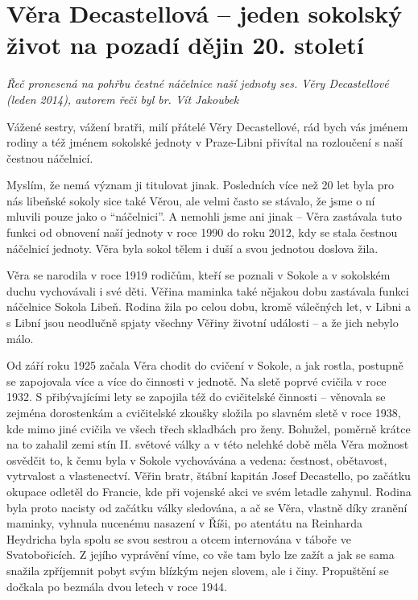 \section{Věra Decastellová -- jeden sokolský život na pozadí dějin 20.
století}\label{vux11bra-decastellovuxe1-jeden-sokolskuxfd-ux17eivot-na-pozaduxed-dux11bjin-20.-stoletuxed}

\emph{Řeč pronesená na pohřbu čestné náčelnice naší jednoty ses. Věry
Decastellové (leden 2014), autorem řeči byl br. Vít Jakoubek}

Vážené sestry, vážení bratři, milí přátelé Věry Decastellové, rád bych
vás jménem rodiny a též jménem sokolské jednoty v Praze-Libni přivítal
na rozloučení s naší čestnou náčelnicí.

Myslím, že nemá význam ji titulovat jinak. Posledních více než 20 let
byla pro nás libeňské sokoly sice také Věrou, ale velmi často se
stávalo, že jsme o ní mluvili pouze jako o ``náčelnici''. A nemohli jsme
ani jinak -- Věra zastávala tuto funkci od obnovení naší jednoty v roce
1990 do roku 2012, kdy se stala čestnou náčelnicí jednoty. Věra byla
sokol tělem i duší a svou jednotou doslova žila.

Věra se narodila v roce 1919 rodičům, kteří se poznali v Sokole a v
sokolském duchu vychovávali i své děti. Věřina maminka také nějakou dobu
zastávala funkci náčelnice Sokola Libeň. Rodina žila po celou dobu,
kromě válečných let, v Libni a s Libní jsou neodlučně spjaty všechny
Věřiny životní události -- a že jich nebylo málo.

Od září roku 1925 začala Věra chodit do cvičení v Sokole, a jak rostla,
postupně se zapojovala více a více do činnosti v jednotě. Na sletě
poprvé cvičila v roce 1932. S přibývajícími lety se zapojila též do
cvičitelské činnosti -- věnovala se zejména dorostenkám a cvičitelské
zkoušky složila po slavném sletě v roce 1938, kde mimo jiné cvičila ve
všech třech skladbách pro ženy. Bohužel, poměrně krátce na to zahalil
zemi stín II. světové války a v této nelehké době měla Věra možnost
osvědčit to, k čemu byla v Sokole vychovávána a vedena: čestnost,
obětavost, vytrvalost a vlastenectví. Věřin bratr, štábní kapitán Josef
Decastello, po začátku okupace odletěl do Francie, kde při vojenské akci
ve svém letadle zahynul. Rodina byla proto nacisty od začátku války
sledována, a ač se Věra, vlastně díky zranění maminky, vyhnula nucenému
nasazení v Říši, po atentátu na Reinharda Heydricha byla spolu se svou
sestrou a otcem internována v táboře ve Svatobořicích. Z jejího
vyprávění víme, co vše tam bylo lze zažít a jak se sama snažila
zpříjemnit pobyt svým blízkým nejen slovem, ale i činy. Propuštění se
dočkala po bezmála dvou letech v roce 1944.


